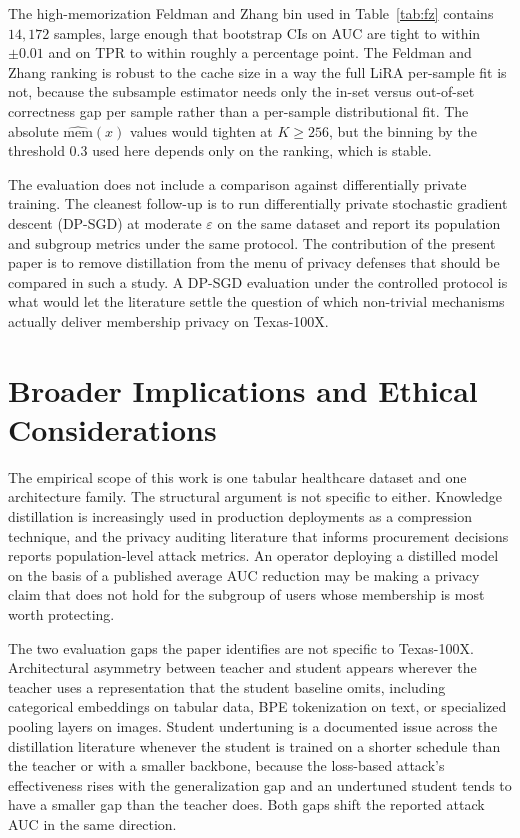 \documentclass[conference]{IEEEtran}
\begin{document}
The high-memorization Feldman and Zhang bin used in Table~\ref{tab:fz} contains $14{,}172$ samples, large enough that bootstrap CIs on AUC are tight to within $\pm 0.01$ and on TPR to within roughly a percentage point. The Feldman and Zhang ranking is robust to the cache size in a way the full LiRA per-sample fit is not, because the subsample estimator needs only the in-set versus out-of-set correctness gap per sample rather than a per-sample distributional fit. The absolute $\widehat{\mathrm{mem}}(x)$ values would tighten at $K \geq 256$, but the binning by the threshold $0.3$ used here depends only on the ranking, which is stable.

The evaluation does not include a comparison against differentially private training. The cleanest follow-up is to run differentially private stochastic gradient descent (DP-SGD) at moderate $\varepsilon$ on the same dataset and report its population and subgroup metrics under the same protocol. The contribution of the present paper is to remove distillation from the menu of privacy defenses that should be compared in such a study. A DP-SGD evaluation under the controlled protocol is what would let the literature settle the question of which non-trivial mechanisms actually deliver membership privacy on Texas-100X.

\section*{Broader Implications and Ethical Considerations}

The empirical scope of this work is one tabular healthcare dataset and one architecture family. The structural argument is not specific to either. Knowledge distillation is increasingly used in production deployments as a compression technique, and the privacy auditing literature that informs procurement decisions reports population-level attack metrics. An operator deploying a distilled model on the basis of a published average AUC reduction may be making a privacy claim that does not hold for the subgroup of users whose membership is most worth protecting.

The two evaluation gaps the paper identifies are not specific to Texas-100X. Architectural asymmetry between teacher and student appears wherever the teacher uses a representation that the student baseline omits, including categorical embeddings on tabular data, BPE tokenization on text, or specialized pooling layers on images. Student undertuning is a documented issue across the distillation literature whenever the student is trained on a shorter schedule than the teacher or with a smaller backbone, because the loss-based attack's effectiveness rises with the generalization gap and an undertuned student tends to have a smaller gap than the teacher does. Both gaps shift the reported attack AUC in the same direction.
\end{document}
